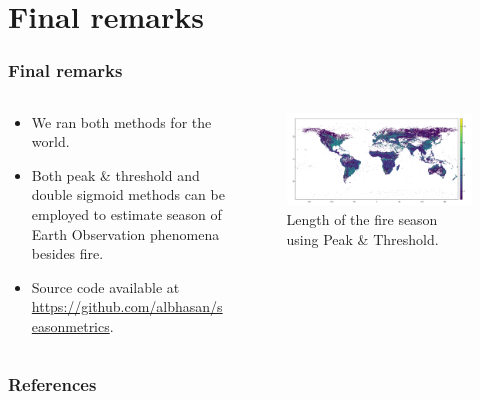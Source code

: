 \documentclass[aspectratio=169]{beamer}
\begin{document}
\section{Final remarks}

\begin{frame}
    \frametitle{Final remarks}
    \begin{columns}
        \begin{column}{0.5\linewidth}
            \begin{itemize}
                \item We ran both methods for the world.
                \item Both peak \& threshold and double sigmoid methods can be
                    employed to estimate season of Earth Observation phenomena 
                    besides fire.
                \item Source code available at
                    \url{https://github.com/albhasan/seasonmetrics}.
            \end{itemize}
        \end{column}
        \begin{column}{0.5\linewidth}
            \begin{figure}[h]
                \includegraphics[width=0.99\linewidth]
                {./images/pthres_world.png}
                \caption{Length of the fire season using Peak \& Threshold.}
            \end{figure}
        \end{column}
    \end{columns}
\end{frame}

\begin{frame}[allowframebreaks]
    \frametitle{References}
    
    
\end{frame}
\end{document}
